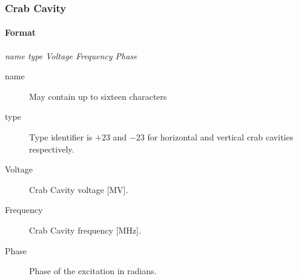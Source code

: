 \documentclass[a4paper,11pt]{report}
\begin{document}




\subsubsection{Crab Cavity} \label{CrabCav}

\paragraph{Format} {\em name type Voltage Frequency Phase}
\begin{description}
\item [name] May contain up to sixteen characters
\item [type] Type identifier is $+23$ and $-23$ for horizontal and vertical
  crab cavities respectively.
\item [Voltage] Crab Cavity voltage [MV].
\item [Frequency] Crab Cavity frequency [MHz]. 
\item [Phase] Phase of the excitation in radians.
\end{description}
\end{document}
